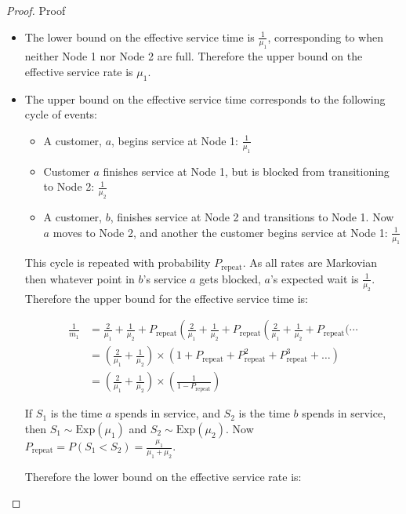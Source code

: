 \documentclass{article}
\numberwithin{equation}{section}
\begin{document}
\begin{proof}{Proof}
\begin{enumerate}
\begin{itemize}
\begin{itemize}

\item The lower bound on the effective service time is $\frac{1}{\mu_1}$, corresponding to when neither Node 1 nor Node 2 are full.
Therefore the upper bound on the effective service rate is $\mu_1$.

\item The upper bound on the effective service time corresponds to the following cycle of events:

\begin{itemize}
  \item A customer, $a$, begins service at Node 1: $\frac{1}{\mu_1}$
  \item Customer $a$ finishes service at Node 1, but is blocked from transitioning to Node 2: $\frac{1}{\mu_2}$
  \item A customer, $b$, finishes service at Node 2 and transitions to Node 1. Now $a$ moves to Node 2, and another the customer begins service at Node 1: $\frac{1}{\mu_1}$
\end{itemize}

This cycle is repeated with probability $P_{\text{repeat}}$.
As all rates are Markovian then whatever point in $b$'s service $a$ gets blocked, $a$'s expected wait is $\frac{1}{\mu_2}$.
Therefore the upper bound for the effective service time is:

\begin{align*}
  \frac{1}{m_1} & = \frac{2}{\mu_1} + \frac{1}{\mu_2} + P_{\text{repeat}} \left( \frac{2}{\mu_1} + \frac{1}{\mu_2} + P_{\text{repeat}} \left( \frac{2}{\mu_1} + \frac{1}{\mu_2} + P_{\text{repeat}} \bigg( \dotsi \right. \right. \\
  & = \left( \frac{2}{\mu_1} + \frac{1}{\mu_2} \right) \times \left( 1 + P_{\text{repeat}} + P_{\text{repeat}}^2 + P_{\text{repeat}}^3 + \dots \right) \\
  & = \left( \frac{2}{\mu_1} + \frac{1}{\mu_2} \right) \times \left( \frac{1}{1 - P_{\text{repeat}}} \right)
\end{align*}

If $S_1$ is the time $a$ spends in service, and $S_2$ is the time $b$ spends in service, then $S_1 \sim \text{Exp}(\mu_1)$ and $S_2 \sim \text{Exp}(\mu_2)$.
Now $P_{\text{repeat}} = P(S_1 < S_2) = \frac{\mu_1}{\mu_1 + \mu_2}$.

Therefore the lower bound on the effective service rate is:


\end{itemize}
\end{itemize}
\end{enumerate}
\end{proof}
\end{document}
